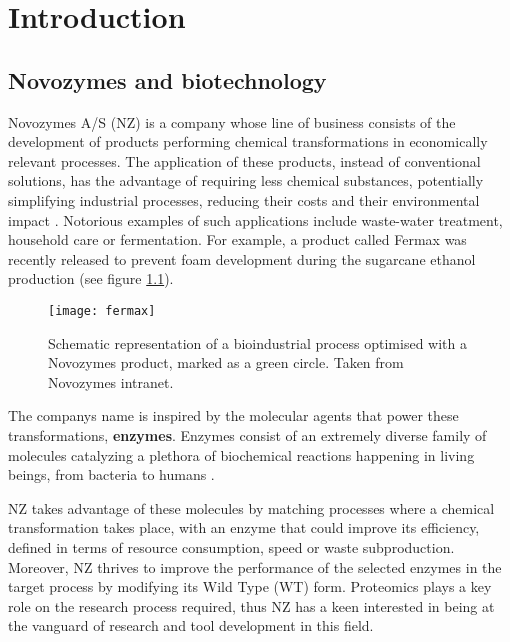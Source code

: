 \chapter{Introduction}
\label{chap:introduction}



\section{Novozymes and biotechnology}


Novozymes A/S (\ac{NZ}) is a company whose line of business consists of the development of products performing chemical transformations in economically relevant processes. The application of these products, instead of conventional solutions, has the advantage of requiring less chemical substances, potentially simplifying industrial processes, reducing their costs and their environmental impact \cite{madigan2000brock}. Notorious examples of such applications include waste-water treatment, household care or fermentation. For example, a product called Fermax was recently released to prevent foam development during the sugarcane ethanol production (see figure \ref{fig:ethanol}).

\begin{figure}[!h]
\centering
  \texttt{[image: fermax]}
\caption[Example of bioprocess optimised by Novozymes]{Schematic representation of a bioindustrial process optimised with a Novozymes product, marked as a green circle. Taken from Novozymes intranet.}
\label{fig:ethanol}
\end{figure}

The company\textquotesingle s name is inspired by the molecular agents that power these transformations, \textbf{enzymes}. Enzymes consist of an extremely diverse family of molecules catalyzing a plethora of biochemical reactions happening in living beings, from bacteria to humans \cite{Nelson2008}. 

\ac{NZ} takes advantage of these molecules by matching processes where a chemical transformation takes place, with an enzyme that could improve its efficiency, defined in terms of resource consumption, speed or waste subproduction. Moreover, \ac{NZ} thrives to improve the performance of the selected enzymes in the target process by modifying its Wild Type (WT) form. Proteomics plays a key role on the research process required, thus \ac{NZ} has a keen interested in being at the vanguard of research and tool development in this field.

